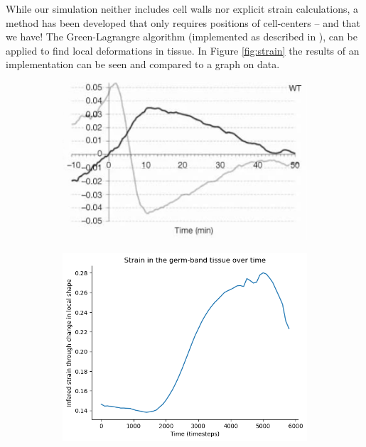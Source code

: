 While our simulation neither includes cell walls nor explicit strain calculations, a method has been developed that only requires positions of cell-centers -- and that we have! The Green-Lagrangre algorithm (implemented as described in ), can be applied to find local deformations in tissue. In Figure \ref{fig:strain} the results of an implementation can be seen and compared to a graph on data.
\begin{figure}[H]
    \centering
    \begin{subfigure}{0.45\linewidth}
        \centering
        \includegraphics[width = \linewidth]{chapters/Results/figures/strain_rate_extrinsic2.png}
    \end{subfigure}
        \begin{subfigure}{0.45\linewidth}
        \centering
        \includegraphics[width = \linewidth]{chapters/Results/figures/strain_smoothedpng.png}

\end{subfigure}
\end{figure}
